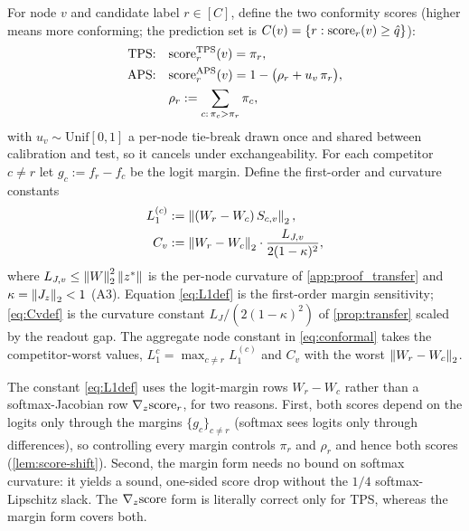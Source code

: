 \begin{definition}
\label{def:conf-scores}
For node $v$ and candidate label $r\in[C]$, define the two conformity scores (higher means more
conforming; the prediction set is $C(v)=\{r:\mathrm{score}_r(v)\ge\hat q\}$):
\begin{align}
\text{TPS:}\quad&\mathrm{score}^{\mathrm{TPS}}_r(v)=\pi_r,\\
\text{APS:}\quad&\mathrm{score}^{\mathrm{APS}}_r(v)=1-\big(\rho_r+u_v\,\pi_r\big),\\
&\rho_r:=\sum_{c:\,\pi_c>\pi_r}\pi_c,
\label{eq:aps}
\end{align}
with $u_v\sim\mathrm{Unif}[0,1]$ a per-node tie-break drawn once and shared between calibration and test,
so it cancels under exchangeability. For each competitor $c\ne r$ let $g_c:=f_r-f_c$ be the logit
margin. Define the first-order and curvature constants
\begin{align}
L_1^{(c)}&:=\left\|(W_r-W_c)\,S_{c,v}\right\|_2,
\label{eq:L1def}\\
C_v&:=\left\|W_r-W_c\right\|_2\cdot\frac{L_{J,v}}{2(1-\kappa)^2},
\label{eq:Cvdef}
\end{align}
where $L_{J,v}\le\left\|W\right\|_2^2\left\|z^{*}\right\|$ is the per-node curvature of \cref{app:proof_transfer} and
$\kappa=\left\|J_z\right\|_2<1$ (A3). Equation \eqref{eq:L1def} is the first-order margin sensitivity;
\eqref{eq:Cvdef} is the curvature constant $L_J/(2(1-\kappa)^2)$ of \cref{prop:transfer} scaled by the
readout gap. The aggregate node constant in \cref{eq:conformal} takes the competitor-worst values,
$L_1^{c}=\max_{c\ne r}L_1^{(c)}$ and $C_v$ with the worst $\left\|W_r-W_c\right\|_2$.
\end{definition}

\begin{remark}
\label{rem:margin-not-grad}
The constant \eqref{eq:L1def} uses the logit-margin rows $W_r-W_c$ rather than a softmax-Jacobian row
$\nabla_z\mathrm{score}_r$, for two reasons. First, both scores depend on the logits only through the margins
$\{g_c\}_{c\ne r}$ (softmax sees logits only through differences), so controlling every margin controls
$\pi_r$ and $\rho_r$ and hence both scores (\cref{lem:score-shift}). Second, the margin form needs no
bound on softmax curvature: it yields a sound, one-sided score drop without the $1/4$ softmax-Lipschitz
slack. The $\nabla_z\mathrm{score}$ form is literally correct only for TPS, whereas the margin form covers both.
\end{remark}

